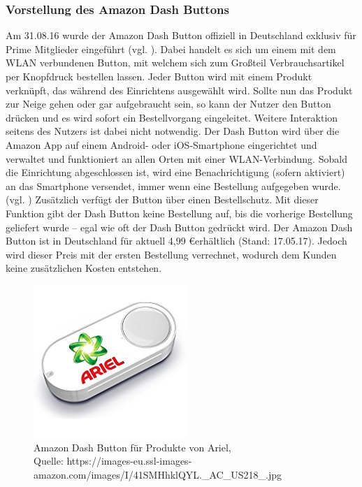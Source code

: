 \subsubsection{Vorstellung des Amazon Dash Buttons}        
\label{sec:Vorstellung des Amazon Dash Buttons} 
Am 31.08.16 wurde der Amazon Dash Button offiziell in Deutschland exklusiv für Prime Mitglieder eingeführt (vgl. \cite{ONLINE.31.08.2016}).
Dabei handelt es sich um einem mit dem WLAN verbundenen Button, mit welchem sich zum Großteil Verbrauchsartikel per Knopfdruck bestellen lassen.
Jeder Button wird mit einem Produkt verknüpft, das während des Einrichtens ausgewählt wird.
Sollte nun das Produkt zur Neige gehen oder gar aufgebraucht sein, so kann der Nutzer den Button drücken und es wird sofort ein Bestellvorgang eingeleitet.
Weitere Interaktion seitens des Nutzers ist dabei nicht notwendig.
Der Dash Button wird über die Amazon App auf einem Android- oder iOS-Smartphone eingerichtet und verwaltet und funktioniert an allen Orten mit einer WLAN-Verbindung.
Sobald die Einrichtung abgeschlossen ist, wird eine Benachrichtigung (sofern aktiviert) an das Smartphone versendet, immer wenn eine Bestellung aufgegeben wurde. (vgl. \cite{.q})
Zusätzlich verfügt der Button über einen Bestellschutz.
Mit dieser Funktion gibt der Dash Button keine Bestellung auf, bis die vorherige Bestellung geliefert wurde – egal wie oft der Dash Button gedrückt wird.
Der Amazon Dash Button ist in Deutschland für aktuell 4,99 \euro erhältlich (Stand: 17.05.17).
Jedoch wird dieser Preis mit der ersten Bestellung verrechnet, wodurch dem Kunden keine zusätzlichen Kosten entstehen.

\begin{figure}[!htb]
	\centering
	\includegraphics[scale=0.5]{Dash.jpg}
	\caption[Amazon Dash Button für Produkte von Ariel]{Amazon Dash Button für Produkte von Ariel,\\ Quelle: https://images-eu.ssl-images-amazon.com/images/I/41SMHhklQYL.\_AC\_US218\_.jpg}
\end{figure}

